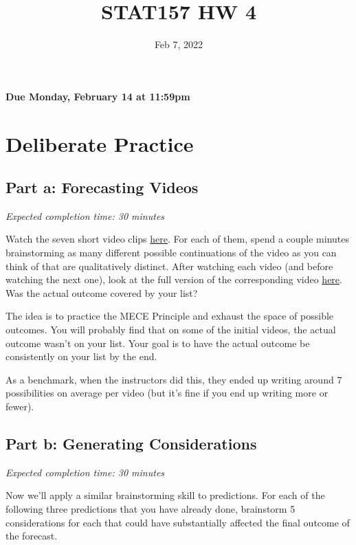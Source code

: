 \documentclass[11pt]{article}
\title{STAT157 HW 4}
\date{Feb 7, 2022}
\begin{document}
\maketitle

\hfill \textbf{Due Monday, February 14 at 11:59pm}

\section*{Deliberate Practice}

\subsection*{Part a: Forecasting Videos}

\emph{Expected completion time: 30 minutes}

Watch the seven short video clips \href{http://www.stat157.com/assets/initial_clips.zip}{here}. For each of them, spend a couple minutes brainstorming as many different 
possible continuations of the video as you can think of that are qualitatively distinct. After watching each video (and before watching the next one), look at the 
full version of the corresponding video \href{http://www.stat157.com/assets/full_videos.zip}{here}. Was the actual outcome covered by your list?

The idea is to practice the MECE Principle and exhaust the space of possible outcomes. You will probably find that on some of the initial videos, the actual outcome wasn't on your list. 
Your goal is to have the actual outcome be consistently on your list by the end.

As a benchmark, when the instructors did this, they ended up writing around 7 possibilities on average per video (but it's fine if you end up writing more or fewer).


\subsection*{Part b: Generating Considerations}

\emph{Expected completion time: 30 minutes}

Now we'll apply a similar brainstorming skill to predictions. 
For each of the following three predictions that you have already done, brainstorm 5 considerations for each that could have substantially affected the final outcome of the forecast.
\end{document}
